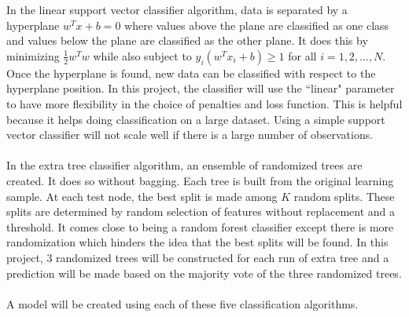 \documentclass{article}
\begin{document}
In the linear support vector classifier algorithm, data is separated by a hyperplane $w^Tx + b = 0$ where values above the plane are classified as one class and values below the plane are classified as the other plane. It does this by minimizing $ \frac{1}{2}w^Tw$ while also subject to $y_i(w^Tx_i + b) \geq 1$ for all $i = 1,2,\dots,N$. Once the hyperplane is found, new data can be classified with respect to the hyperplane position. In this project, the classifier will use the ``linear" parameter to have more flexibility in the choice of penalties and loss function. This is helpful because it helps doing classification on a large dataset.  Using a simple support vector classifier will not scale well if there is a large number of observations. \\~\\
In the extra tree classifier algorithm, an ensemble of randomized trees are created. It does so without bagging. Each tree is built from the original learning sample. At each test node, the best split is made among $K$ random splits. These splits are determined by random selection of features without replacement and a threshold. It comes close to being a random forest classifier except there is more randomization which hinders the idea that the best splits will be found. In this project, $3$ randomized trees will be constructed for each run of extra tree and a prediction will be made based on the majority vote of the three randomized trees. \\~\\
A model will be created using each of these five classification algorithms. 
\end{document}
